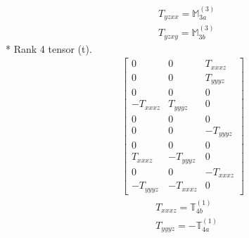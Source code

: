 \documentclass[fleqn,8pt,landscape]{jsarticle}
\begin{document}
\begin{align*}
& T_{yzxx} = \mathbb{M}_{3a}^{(3)} \\
& T_{yzxy} = \mathbb{M}_{3b}^{(3)}
\end{align*}
* Rank 4 tensor (t).
\begin{align*}
\begin{bmatrix} 0 & 0 & T_{xxxz} \\ 0 & 0 & T_{yyyz} \\ 0 & 0 & 0 \\ - T_{xxxz} & T_{yyyz} & 0 \\ 0 & 0 & 0 \\ 0 & 0 & - T_{yyyz} \\ 0 & 0 & 0 \\ T_{xxxz} & - T_{yyyz} & 0 \\ 0 & 0 & - T_{xxxz} \\ - T_{yyyz} & - T_{xxxz} & 0 \end{bmatrix}
\end{align*}
\begin{align*}
& T_{xxxz} = \mathbb{T}_{4b}^{(1)} \\
& T_{yyyz} = - \mathbb{T}_{4a}^{(1)}
\end{align*}
\end{document}
